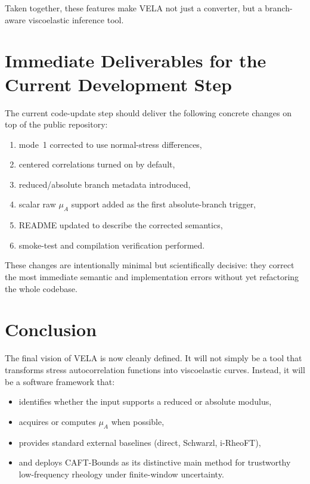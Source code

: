 \documentclass[11pt]{article}
\begin{document}
Taken together, these features make VELA not just a converter, but a branch-aware viscoelastic inference tool.

\section{Immediate Deliverables for the Current Development Step}

The current code-update step should deliver the following concrete changes on top of the public repository:
\begin{enumerate}[leftmargin=2em]
  \item mode~1 corrected to use normal-stress differences,
  \item centered correlations turned on by default,
  \item reduced/absolute branch metadata introduced,
  \item scalar raw $\mu_A$ support added as the first absolute-branch trigger,
  \item README updated to describe the corrected semantics,
  \item smoke-test and compilation verification performed.
\end{enumerate}

These changes are intentionally minimal but scientifically decisive: they correct the most immediate semantic and implementation errors without yet refactoring the whole codebase.

\section{Conclusion}

The final vision of VELA is now cleanly defined. It will not simply be a tool that transforms stress autocorrelation functions into viscoelastic curves. Instead, it will be a software framework that:
\begin{itemize}[leftmargin=2em]
  \item identifies whether the input supports a reduced or absolute modulus,
  \item acquires or computes $\mu_A$ when possible,
  \item provides standard external baselines (direct, Schwarzl, i-RheoFT),
  \item and deploys CAFT-Bounds as its distinctive main method for trustworthy low-frequency rheology under finite-window uncertainty.
\end{itemize}
\end{document}
